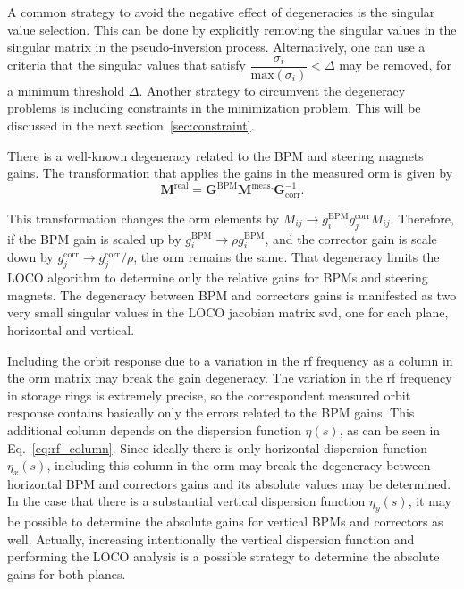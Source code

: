 A common strategy to avoid the negative effect of degeneracies is the singular value selection. This can be done by explicitly removing the singular values in the singular matrix in the pseudo-inversion process. Alternatively, one can use a criteria that the singular values that satisfy $\dfrac{\sigma_i}{\mathrm{max}\left(\sigma_i\right)} < \Delta$ may be removed, for a minimum threshold $\Delta$. Another strategy to circumvent the degeneracy problems is including constraints in the minimization problem. This will be discussed in the next section~\ref{sec:constraint}. 

There is a well-known degeneracy related to the BPM and steering magnets gains. The transformation that applies the gains in the measured \gls{orm} is given by 
\begin{equation}
    \mathbf{M}^{\mathrm{real}} = \mathbf{G}^{\mathrm{BPM}} \mathbf{M}^{\mathrm{meas.}}\mathbf{G}^{-1}_{\mathrm{corr}}.
\end{equation}

This transformation changes the \gls{orm} elements by $M_{ij} \rightarrow g_{i}^{\mathrm{BPM}}g_{j}^{\mathrm{corr}}M_{ij}$. Therefore, if the BPM gain is scaled up by $g_{i}^{\mathrm{BPM}} \rightarrow \rho g_{i}^{\mathrm{BPM}}$, and the corrector gain is scale down by $g_{j}^{\mathrm{corr}} \rightarrow g_{j}^{\mathrm{corr}}/\rho$, the \gls{orm} remains the same. That degeneracy limits the LOCO algorithm to determine only the relative gains for BPMs and steering magnets. The degeneracy between BPM and correctors gains is manifested as two very small singular values in the LOCO jacobian matrix \gls{svd}, one for each plane, horizontal and vertical.

Including the orbit response due to a variation in the \gls{rf} frequency as a column in the \gls{orm} matrix may break the gain degeneracy. The variation in the \gls{rf} frequency in storage rings is extremely precise, so the correspondent measured orbit response contains basically only the errors related to the BPM gains. This additional column depends on the dispersion function $\eta(s)$, as can be seen in Eq.~\eqref{eq:rf_column}. Since ideally there is only horizontal dispersion function $\eta_x(s)$, including this column in the \gls{orm} may break the degeneracy between horizontal BPM and correctors gains and its absolute values may be determined. In the case that there is a substantial vertical dispersion function $\eta_y(s)$, it may be possible to determine the absolute gains for vertical BPMs and correctors as well. Actually, increasing intentionally the vertical dispersion function and performing the LOCO analysis is a possible strategy to determine the absolute gains for both planes.
